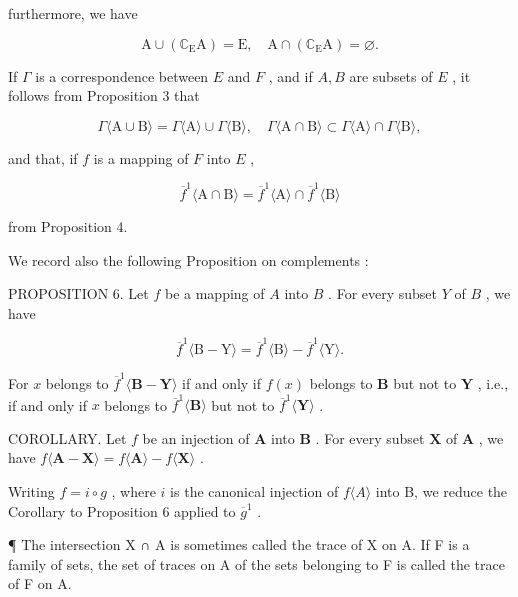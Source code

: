furthermore, we have

\[
\mathrm{A} \cup (\mathbb {C} _ {\mathrm{E}} \mathrm{A}) = \mathrm{E}, \quad \mathrm{A} \cap (\mathbb {C} _ {\mathrm{E}} \mathrm{A}) = \varnothing .
\]

If \(\Gamma\) is a correspondence between \(E\) and \(F\) , and if \(A, B\) are subsets of \(E\) , it follows from Proposition 3 that

\[
\Gamma \langle \mathrm{A} \cup \mathrm{B} \rangle = \Gamma \langle \mathrm{A} \rangle \cup \Gamma \langle \mathrm{B} \rangle , \quad \Gamma \langle \mathrm{A} \cap \mathrm{B} \rangle \subset \Gamma \langle \mathrm{A} \rangle \cap \Gamma \langle \mathrm{B} \rangle ,
\]

and that, if \(f\) is a mapping of \(F\) into \(E\) ,

\[
\overline {{{f}}} ^ {1} \langle \mathrm{A} \cap \mathrm{B} \rangle = \overline {{{f}}} ^ {1} \langle \mathrm{A} \rangle \cap \overline {{{f}}} ^ {1} \langle \mathrm{B} \rangle
\]

from Proposition 4.

We record also the following Proposition on complements :

PROPOSITION 6. Let \(f\) be a mapping of \(A\) into \(B\) . For every subset \(Y\) of \(B\) , we have

\[
\overline {{{f}}} ^ {1} \langle \mathrm{B} - \mathrm{Y} \rangle = \overline {{{f}}} ^ {1} \langle \mathrm{B} \rangle - \overline {{{f}}} ^ {1} \langle \mathrm{Y} \rangle .
\]

For \(x\) belongs to \(\overline{f}^1\langle \mathbf{B} - \mathbf{Y}\rangle\) if and only if \(f(x)\) belongs to \(\mathbf{B}\) but not to \(\mathbf{Y}\) , i.e., if and only if \(x\) belongs to \(\overline{f}^1\langle \mathbf{B}\rangle\) but not to \(\overline{f}^1\langle \mathbf{Y}\rangle\) .

COROLLARY. Let \(f\) be an injection of \(\mathbf{A}\) into \(\mathbf{B}\) . For every subset \(\mathbf{X}\) of \(\mathbf{A}\) , we have \(f\langle \mathbf{A} - \mathbf{X}\rangle = f\langle \mathbf{A}\rangle - f\langle \mathbf{X}\rangle\) .

Writing \(f = i \circ g\) , where \(i\) is the canonical injection of \(f\langle A\rangle\) into B, we reduce the Corollary to Proposition 6 applied to \(\overline{g}^1\) .

¶ The intersection X ∩ A is sometimes called the trace of X on A. If F is a family of sets, the set of traces on A of the sets belonging to F is called the trace of F on A.

